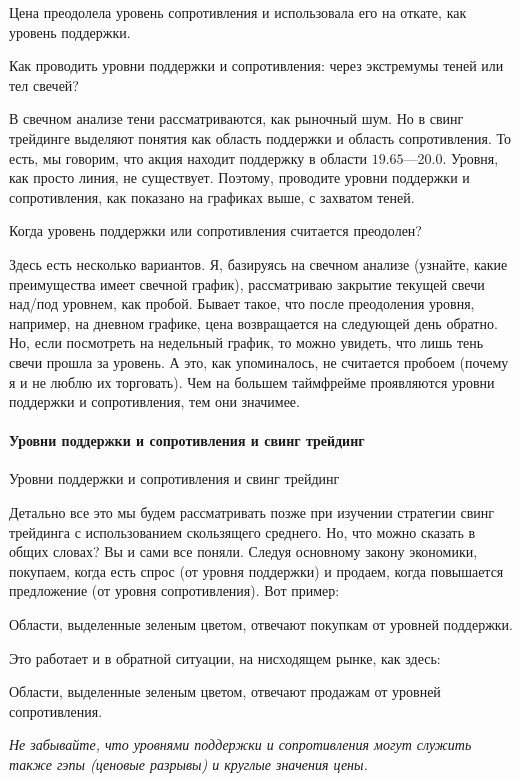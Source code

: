 \documentclass{book}
\begin{document}
Цена преодолела уровень сопротивления и использовала его на откате, как уровень поддержки.

Как проводить уровни поддержки и сопротивления: через экстремумы теней или тел свечей?

В свечном анализе тени  рассматриваются, как рыночный шум. Но в свинг трейдинге выделяют понятия как область поддержки и область сопротивления. То есть, мы говорим, что акция находит поддержку в области $19.65 — $20.0. Уровня, как просто линия, не существует. Поэтому, проводите уровни поддержки и сопротивления, как показано на графиках выше, с захватом теней.

Когда уровень поддержки или сопротивления считается преодолен?

Здесь есть несколько вариантов. Я, базируясь на свечном анализе
(узнайте, какие преимущества имеет свечной график), рассматриваю
закрытие текущей свечи над/под уровнем, как пробой. Бывает такое, что
после преодоления уровня, например, на дневном графике, цена
возвращается на следующей день обратно. Но, если посмотреть на
недельный график, то можно увидеть, что лишь тень свечи прошла за
уровень. А это, как упоминалось, не считается пробоем (почему я и не
люблю их торговать). Чем на большем таймфрейме проявляются уровни
поддержки и сопротивления, тем они значимее.

\paragraph{Уровни поддержки и сопротивления и свинг трейдинг}

Уровни поддержки и сопротивления и свинг трейдинг

Детально все это мы будем рассматривать позже при изучении стратегии свинг трейдинга с использованием скользящего среднего. Но, что можно сказать в общих словах? Вы и сами все поняли. Следуя основному закону экономики, покупаем, когда есть спрос (от уровня поддержки) и продаем, когда повышается предложение (от уровня сопротивления). Вот пример:

Области, выделенные зеленым цветом, отвечают покупкам от уровней поддержки.

Это работает и в обратной ситуации, на нисходящем рынке, как здесь:

Области, выделенные зеленым цветом, отвечают продажам от уровней
сопротивления.

\emph{Не забывайте, что уровнями поддержки и сопротивления могут
  служить также гэпы (ценовые разрывы) и круглые значения цены.}
\end{document}
